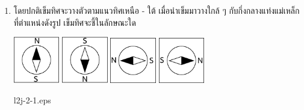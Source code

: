 \begin{enumerate}
\item 	\begin{ljrp}\runningj \nonet โดยปกติเข็มทิศจะวางตัวตามแนวทิศเหนือ - ใต้  เมื่อนำเข็มมาวางใกล้ ๆ กับกึ่งกลางแท่งแม่เหล็กที่ตำแหน่งดังรูป  เข็มทิศจะชี้ในลักษณะใด
    \begin{2c}
        {\begin{adjustbox}{valign=t}\includegraphics[width=2cm]{l2j-2-2.eps}\end{adjustbox}}
        {\begin{adjustbox}{valign=t}\includegraphics[width=2cm]{l2j-2-3.eps}\end{adjustbox}}
        {\begin{adjustbox}{valign=t}\includegraphics[width=2cm]{l2j-2-4.eps}\end{adjustbox}}
        {\begin{adjustbox}{valign=t}\includegraphics[width=2cm]{l2j-2-5.eps}\end{adjustbox}}
    \end{2c} 
		\end{ljrp}
		\begin{rp}{l2j-2-1.eps}\end{rp}
\end{enumerate}




